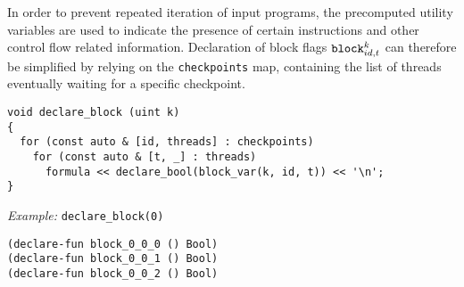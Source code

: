 

\noindent
In order to prevent repeated iteration of input programs,
the precomputed utility variables are used to indicate the presence of certain instructions and other control flow related information.
Declaration of block flags $\texttt{block}^k_{id, t}$ can therefore be simplified by relying on the \texttt{checkpoints} map,
containing the list of threads eventually waiting for a specific checkpoint.

\begin{lstlisting}[style=c++]
void declare_block (uint k)
{
  for (const auto & [id, threads] : checkpoints)
    for (const auto & [t, _] : threads)
      formula << declare_bool(block_var(k, id, t)) << '\n';
}
\end{lstlisting}

\noindent
\emph{Example:} \lstinline[style=c++]{declare_block(0)}

\begin{lstlisting}[language=SMTLib]
(declare-fun block_0_0_0 () Bool)
(declare-fun block_0_0_1 () Bool)
(declare-fun block_0_0_2 () Bool)
\end{lstlisting}

